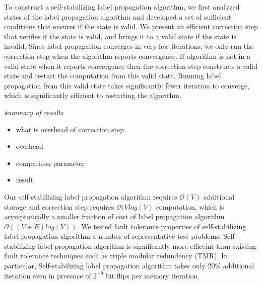 To construct a self-stabilizing label propagation algorithm, we first
analyzed states of the label propagation algorithm and developed a
set of sufficient conditions that ensures if the state is valid. We
present an efficient correction step that verifies if the state is
valid, and brings it to a valid state if the state is invalid.%
{} Since label propagation converges in very few iterations, we only
run the correction step when the algorithm reports convergence. If
algorithm is not in a valid state when it reports convergence then
the correction step constructs a valid state and restart the computation
from this valid state. Running label propagation from this valid state
takes significantly fewer iteration to converge, which is significantly
efficient to restarting the algorithm.

\textbf{\emph{}}%
\begin{lyxgreyedout}
\textbf{\emph{s}}\emph{ummary of results} 
\begin{itemize}
\item what is overhead of correction step 
\item overhead 
\item comparison parameter 
\item result 
\end{itemize}
\end{lyxgreyedout}

Our self-stabilizing label propagation algorithm requires $\mathcal{O}(V)$
additional storage and correction step requires $\mathcal{O}(Vlog(V)$
computation, which is asymptotically a smaller fraction of cost of
label propagation algorithm $\mathcal{O}((V+E)log(V))$. We tested
fault tolerance properties of self-stabilizing label propagation algorithm
a number of representative test problems. Self-stabilizing label propagation
algorithm is significantly more efficeint than existing fault tolerance
techniques such as triple modular redundency (TMR). In particular,
Self-stabilizing label propagation algorithm takes only 20\% additional
iteration even in presence of $2^{-9}$ bit flips per memory iteration.


